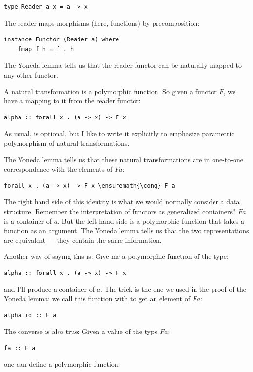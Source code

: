 \begin{Verbatim}
type Reader a x = a -> x
\end{Verbatim}
The reader maps morphisms (here, functions) by precomposition:

\begin{Verbatim}
instance Functor (Reader a) where
    fmap f h = f . h
\end{Verbatim}
The Yoneda lemma tells us that the reader functor can be naturally
mapped to any other functor.

A natural transformation is a polymorphic function. So given a functor
$F$, we have a mapping to it from the reader functor:

\begin{Verbatim}
alpha :: forall x . (a -> x) -> F x
\end{Verbatim}
As usual,  is optional, but I like to write it explicitly
to emphasize parametric polymorphism of natural transformations.

The Yoneda lemma tells us that these natural transformations are in
one-to-one correspondence with the elements of $F a$:

\begin{Verbatim}
forall x . (a -> x) -> F x \ensuremath{\cong} F a
\end{Verbatim}
The right hand side of this identity is what we would normally consider
a data structure. Remember the interpretation of functors as generalized
containers? $F a$ is a container of $a$. But the left
hand side is a polymorphic function that takes a function as an
argument. The Yoneda lemma tells us that the two representations are
equivalent --- they contain the same information.

Another way of saying this is: Give me a polymorphic function of the
type:

\begin{Verbatim}
alpha :: forall x . (a -> x) -> F x
\end{Verbatim}
and I'll produce a container of $a$. The trick is the one we used
in the proof of the Yoneda lemma: we call this function with 
to get an element of $F a$:

\begin{Verbatim}
alpha id :: F a
\end{Verbatim}
The converse is also true: Given a value of the type $F a$:

\begin{Verbatim}
fa :: F a
\end{Verbatim}
one can define a polymorphic function:

